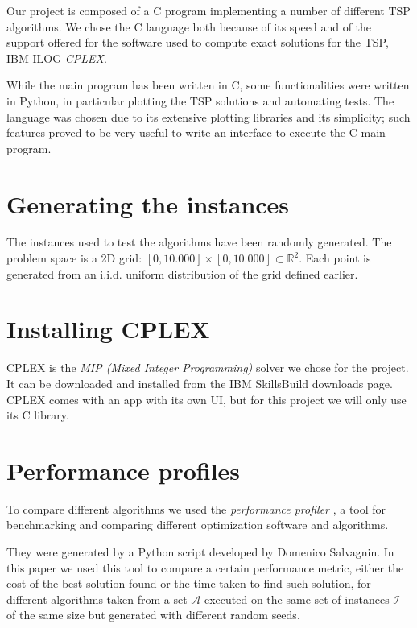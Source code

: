 Our project is composed of a C program implementing a number of different TSP algorithms. We chose the C language both because of its speed and of the support offered for the software used to compute exact solutions for the TSP, IBM ILOG \textit{CPLEX}.

While the main program has been written in C, some functionalities were written in Python, in particular plotting the TSP solutions and automating tests. The language was chosen due to its extensive plotting libraries and its simplicity; such features proved to be very useful to write an interface to execute the C main program.

\section{Generating the instances}

The instances used to test the algorithms have been randomly generated. The problem space is a 2D grid: $[0,10.000]\times[0,10.000]\subset\mathbb{R}^2$. Each point is generated from an i.i.d. uniform distribution of the grid defined earlier.

\section{Installing CPLEX}

CPLEX is the \textit{MIP (Mixed Integer Programming)} solver we chose for the project. It can be downloaded and installed from the IBM SkillsBuild downloads page. CPLEX comes with an app with its own UI, but for this project we will only use its C library. 

\section{Performance profiles}

To compare different algorithms we used the \textit{performance profiler} \cite{Dolan2002}, a tool for benchmarking and comparing different optimization software and algorithms.

They were generated by a Python script developed by Domenico Salvagnin. In this paper we used this tool to compare a certain performance metric, either the cost of the best solution found or the time taken to find such solution, for different algorithms taken from a set $\mathcal{A}$ executed on the same set of instances $\mathcal{I}$ of the same size but generated with different random seeds.

